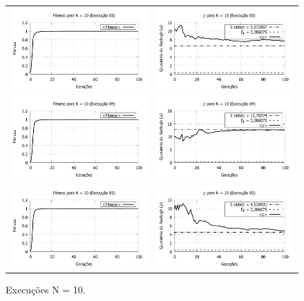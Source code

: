\begin{figure}[p]
\begin{tabular}{@{}cc@{}}
		\includegraphics[width=.45\textwidth]{figs/resultados/fitnessGrad/N10_03_fitness.pdf} &
    \includegraphics[width=.45\textwidth]{figs/resultados/fitnessGrad/N10_03_rho.pdf}   \\
		\includegraphics[width=.45\textwidth]{figs/resultados/fitnessGrad/N10_04_fitness.pdf} &
    \includegraphics[width=.45\textwidth]{figs/resultados/fitnessGrad/N10_04_rho.pdf}   \\
		\includegraphics[width=.45\textwidth]{figs/resultados/fitnessGrad/N10_05_fitness.pdf} &
    \includegraphics[width=.45\textwidth]{figs/resultados/fitnessGrad/N10_05_rho.pdf}
  \end{tabular}
  \caption{Execuções N = 10.}
	\label{fig:execucoes_N10}
\end{figure}

